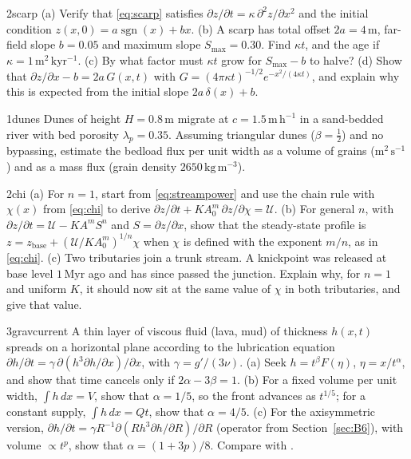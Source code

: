 \documentclass[11pt,letterpaper]{article}
\numberwithin{equation}{section}
\newcommand{\units}[1]{\,\mathrm{#1}}
\DeclareMathOperator{\sgn}{sgn}
\newcommand{\Up}{\mathcal{U}}
\begin{document}
\begin{exercise}{2}{scarp}
(a) Verify that \eqref{eq:scarp} satisfies $\partial z/\partial t=\kappa\,\partial^2z/\partial x^2$ and the initial condition
$z(x,0)=a\sgn(x)+bx$.
(b) A scarp has total offset $2a=4\units{m}$, far-field slope $b=0.05$ and maximum slope $S_{\max}=0.30$. Find $\kappa t$,
and the age if $\kappa=1\units{m^2\,kyr^{-1}}$.
(c) By what factor must $\kappa t$ grow for $S_{\max}-b$ to halve?
(d) Show that $\partial z/\partial x-b=2a\,G(x,t)$ with $G=(4\pi\kappa t)^{-1/2}e^{-x^2/(4\kappa t)}$, and explain why this is
expected from the initial slope $2a\,\delta(x)+b$.
\end{exercise}

\begin{exercise}{1}{dunes}
Dunes of height $H=0.8\units{m}$ migrate at $c=1.5\units{m\,h^{-1}}$ in a sand-bedded river with bed porosity
$\lambda_p=0.35$. Assuming triangular dunes ($\beta=\tfrac12$) and no bypassing, estimate the bedload flux per unit width
as a volume of grains ($\mathrm{m^2\,s^{-1}}$) and as a mass flux (grain density $2650\units{kg\,m^{-3}}$).
\end{exercise}

\begin{exercise}{2}{chi}
(a) For $n=1$, start from \eqref{eq:streampower} and use the chain rule with $\chi(x)$ from \eqref{eq:chi} to derive
$\partial z/\partial t+KA_0^m\,\partial z/\partial\chi=\Up$.
(b) For general $n$, with $\partial z/\partial t=\Up-KA^mS^n$ and $S=\partial z/\partial x$, show that the steady-state profile is
$z=z_{\mathrm{base}}+(\Up/KA_0^m)^{1/n}\chi$ when $\chi$ is defined with the exponent $m/n$, as in \eqref{eq:chi}.
(c) Two tributaries join a trunk stream. A knickpoint was released at base level $1\units{Myr}$ ago and has since passed the
junction. Explain why, for $n=1$ and uniform $K$, it should now sit at the same value of $\chi$ in both tributaries, and give that
value.
\end{exercise}

\begin{exercise}{3}{gravcurrent}
A thin layer of viscous fluid (lava, mud) of thickness $h(x,t)$ spreads on a horizontal plane according to the lubrication
equation $\partial h/\partial t=\gamma\,\partial(h^3\partial h/\partial x)/\partial x$, with $\gamma=g'/(3\nu)$.
(a) Seek $h=t^{\beta}F(\eta)$, $\eta=x/t^{\alpha}$, and show that time cancels only if $2\alpha-3\beta=1$.
(b) For a fixed volume per unit width, $\int h\,dx=V$, show that $\alpha=1/5$, so the front advances as $t^{1/5}$; for a constant
supply, $\int h\,dx=Qt$, show that $\alpha=4/5$.
(c) For the axisymmetric version, $\partial h/\partial t=\gamma R^{-1}\partial(Rh^3\partial h/\partial R)/\partial R$
(operator from Section~\ref{sec:B6}), with volume $\propto t^{p}$, show that $\alpha=(1+3p)/8$. Compare with
\citet{huppert1982}.
\end{exercise}
\end{document}
